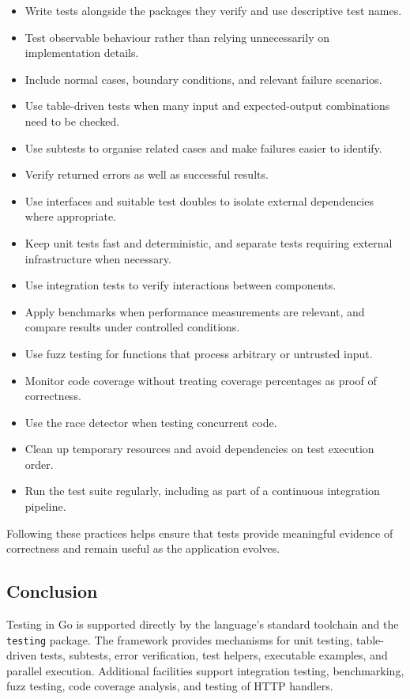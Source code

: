 \begin{itemize}
    \item Write tests alongside the packages they verify and use descriptive test names.
    \item Test observable behaviour rather than relying unnecessarily on implementation details.
    \item Include normal cases, boundary conditions, and relevant failure scenarios.
    \item Use table-driven tests when many input and expected-output combinations need to be checked.
    \item Use subtests to organise related cases and make failures easier to identify.
    \item Verify returned errors as well as successful results.
    \item Use interfaces and suitable test doubles to isolate external dependencies where appropriate.
    \item Keep unit tests fast and deterministic, and separate tests requiring external infrastructure when necessary.
    \item Use integration tests to verify interactions between components.
    \item Apply benchmarks when performance measurements are relevant, and compare results under controlled conditions.
    \item Use fuzz testing for functions that process arbitrary or untrusted input.
    \item Monitor code coverage without treating coverage percentages as proof of correctness.
    \item Use the race detector when testing concurrent code.
    \item Clean up temporary resources and avoid dependencies on test execution order.
    \item Run the test suite regularly, including as part of a continuous integration pipeline.
\end{itemize}

Following these practices helps ensure that tests provide meaningful evidence of correctness and remain useful as the application evolves.

\subsection{Conclusion}

Testing in Go is supported directly by the language's standard toolchain and the \texttt{testing} package. The framework provides mechanisms for unit testing, table-driven tests, subtests, error verification, test helpers, executable examples, and parallel execution. Additional facilities support integration testing, benchmarking, fuzz testing, code coverage analysis, and testing of HTTP handlers.

